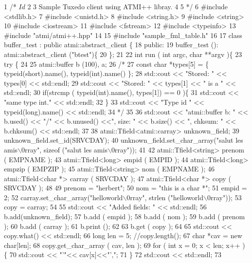 \begin{DoxyCodeInclude}
1 /* $Id$
2 
3    Sample Tuxedo client using ATMI++ libray.
4 
5  */
6 #include <stdlib.h>
7 #include <unistd.h>
8 #include <string.h>
9 #include <string>
10 #include <iostream>
11 #include <fstream>
12 #include <typeinfo>
13 #include "atmi/atmi++.hpp"
14 
15 #include "sample\_fml\_table.h"
16 
17 class buffer\_test : public atmi::abstract\_client \{
18   public:
19     buffer\_test (): atmi::abstract\_client ("btest")\{
20     \};
21 
22     int run ( int argc, char **argv )\{
23       try \{
24 
25         atmi::buffer b (100), a;
26         /*
27            const char *types[5] = \{ typeid(short).name(), typeid(int).name() \};
28            std::cout << "Stored: " << types[0] << std::endl;
29            std::cout << "Stored: " << types[1] << " is a " << std::endl;
30            if(strcmp ( typeid(int).name(), types[1]) == 0 )\{
31            std::cout << "same type int." << std::endl;
32            \}
33            std::cout << "Type id " << typeid(long).name() << std::endl;
34          */
35 
36         std::cout << "atmi::buffer b: " << b.used() << "/" << b.unused() <<", size: " << b.size() << ",
       chksum: " << b.chksum() <<  std::endl;
37 
38         atmi::Tfield<atmi::carray>   unknown\_field;
39         unknown\_field.set\_id(SRVCDAY);
40         unknown\_field.set\_char\_array("salut les amis\(\backslash\)0rray", sizeof ("salut les amis\(\backslash\)0rray"));
41 
42         atmi::Tfield<string> prenom ( EMPNAME );
43         atmi::Tfield<long>   empid ( EMPID );
44         atmi::Tfield<long>   empzip ( EMPZIP );
45         atmi::Tfield<string> nom ( EMPNAME );
46         atmi::Tfield<char *> carray ( SRVCDAY );
47         atmi::Tfield<char *> copy ( SRVCDAY );
48 
49         prenom = "herbert";
50         nom = "this is a char *";
51         empid = 2;
52         carray.set\_char\_array("helloworld\(\backslash\)0rray", strlen ("helloworld\(\backslash\)0rray"));
53         copy = carray;
54 
55         std::cout << "Added fields: " << std::endl;
56         b.add(unknown\_field);
57         b.add ( empid );
58         b.add ( nom );
59         b.add ( prenom );
60         b.add ( carray );
61         b.print ();
62 
63         b.get ( copy );
64 
65         std::cout << copy.what() << std::endl;
66         long len = 5;                  //copy.length();
67         char *cav = new char[len];
68         copy.get\_char\_array ( cav, len );
69         for ( int x = 0; x < len; x++ ) \{
70           std::cout << "'"<< cav[x]<<"',";
71         \}
72         std::cout << std::endl;
73 

\end{DoxyCodeInclude}

